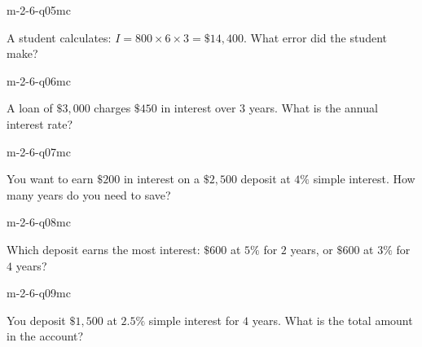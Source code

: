 \begin{practiceQuestion}{m-2-6-q05}{mc}
\begin{questionText}
A student calculates: $I = 800 \times 6 \times 3 = \$14{,}400$. What error did the student make?
\end{questionText}
\end{practiceQuestion}

\begin{practiceQuestion}{m-2-6-q06}{mc}
\begin{questionText}
A loan of $\$3{,}000$ charges $\$450$ in interest over $3$ years. What is the annual interest rate?
\end{questionText}
\end{practiceQuestion}

\begin{practiceQuestion}{m-2-6-q07}{mc}
\begin{questionText}
You want to earn $\$200$ in interest on a $\$2{,}500$ deposit at $4\%$ simple interest. How many years do you need to save?
\end{questionText}
\end{practiceQuestion}

\begin{practiceQuestion}{m-2-6-q08}{mc}
\begin{questionText}
Which deposit earns the most interest: $\$600$ at $5\%$ for $2$ years, or $\$600$ at $3\%$ for $4$ years?
\end{questionText}
\end{practiceQuestion}

\begin{practiceQuestion}{m-2-6-q09}{mc}
\begin{questionText}
You deposit $\$1{,}500$ at $2.5\%$ simple interest for $4$ years. What is the total amount in the account?
\end{questionText}
\end{practiceQuestion}

